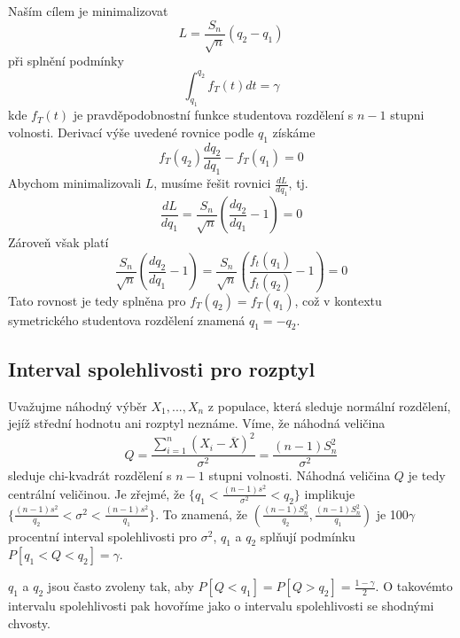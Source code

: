 Naším cílem je minimalizovat
\begin{equation*}
L = \frac{S_n}{\sqrt{n}}(q_2 - q_1)
\end{equation*} 
při splnění podmínky
\begin{equation*}
\int_{q_1}^{q_2} f_T(t) dt = \gamma
\end{equation*}
kde $f_T(t)$ je pravděpodobnostní funkce studentova rozdělení s $n - 1$ stupni volnosti. Derivací výše uvedené rovnice podle $q_1$ získáme
\begin{equation*}
f_T(q_2)\frac{d q_2}{d q_1} - f_T(q_1) = 0
\end{equation*}
Abychom minimalizovali $L$, musíme řešit rovnici $\frac{dL}{d q_1}$, tj.
\begin{equation*}
\frac{dL}{dq_1} = \frac{S_n}{\sqrt{n}}\left(\frac{d q_2}{d q_1} - 1 \right) = 0
\end{equation*}
Zároveň však platí
\begin{equation*}
\frac{S_n}{\sqrt{n}}\left(\frac{d q_2}{d q_1} - 1\right) = \frac{S_n}{\sqrt{n}}\left(\frac{f_t(q_1)}{f_t(q_2)} - 1\right) = 0
\end{equation*}
Tato rovnost je tedy splněna pro $f_T(q_2) = f_T(q_1)$, což v kontextu symetrického studentova rozdělení znamená $q_1 = - q_2$.

\subsection{Interval spolehlivosti pro rozptyl}

Uvažujme náhodný výběr $X_1, ..., X_n$ z populace, která sleduje normální rozdělení, jejíž střední hodnotu ani rozptyl neznáme. Víme, že náhodná veličina
\begin{equation*}
Q = \frac{\sum_{i = 1}^n (X_i - \overline{X})^2}{\sigma^2} = \frac{(n - 1)S_n^2}{\sigma^2}
\end{equation*}
sleduje chi-kvadrát rozdělení s $n - 1$ stupni volnosti. Náhodná veličina $Q$ je tedy centrální veličinou. Je zřejmé, že $\big\{q_1 < \frac{(n - 1)\mathit{s}^2}{\sigma^2} < q_2 \big\}$ implikuje $\big\{\frac{(n - 1) \mathit{s}^2}{q_2} < \sigma^2 < \frac{(n - 1)s^2}{q_1}\big\}$. To znamená, že $\left(\frac{(n - 1)S_n^2}{q_2}, \frac{(n - 1)S_n^2}{q_1} \right)$ je 100$\gamma$ procentní interval spolehlivosti pro $\sigma^2$, $q_1$ a $q_2$ splňují podmínku $P[q_1 < Q < q_2] = \gamma$.

$q_1$ a $q_2$ jsou často zvoleny tak, aby $P[Q < q_1] = P[Q > q_2] = \frac{1 - \gamma}{2}$. O takovémto intervalu spolehlivosti pak hovoříme jako o intervalu spolehlivosti se shodnými chvosty.

